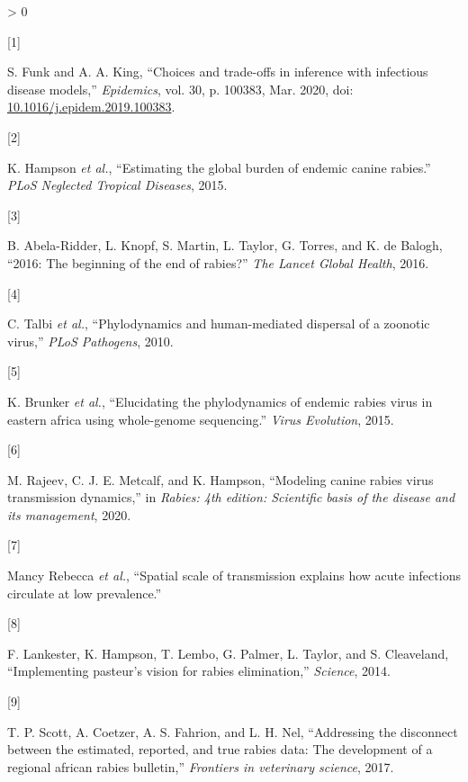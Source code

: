 \documentclass[
  oneside]{book}
\newlength{\cslhangindent}
\newlength{\csllabelwidth}
\newenvironment{CSLReferences}[2] %
 {%
  \setlength{\parindent}{0pt}
  \ifodd #1 \everypar{\setlength{\hangindent}{\cslhangindent}}\ignorespaces\fi
  \ifnum #2 > 0
  \setlength{\parskip}{#2\baselineskip}
  \fi
 }%
 {}
\newcommand{\CSLLeftMargin}[1]{\parbox[t]{\csllabelwidth}{#1}}
\newcommand{\CSLRightInline}[1]{\parbox[t]{\linewidth - \csllabelwidth}{#1}\break}
\begin{document}
\setlength{\parskip}{1em}

\hypertarget{refs_main}{}
\begin{CSLReferences}{0}{0}
\leavevmode\hypertarget{ref-funk2020}{}%
\CSLLeftMargin{{[}1{]} }
\CSLRightInline{S. Funk and A. A. King, {``Choices and trade-offs in inference with infectious disease models,''} \emph{Epidemics}, vol. 30, p. 100383, Mar. 2020, doi: \href{https://doi.org/10.1016/j.epidem.2019.100383}{10.1016/j.epidem.2019.100383}.}

\leavevmode\hypertarget{ref-hampson2015}{}%
\CSLLeftMargin{{[}2{]} }
\CSLRightInline{K. Hampson \emph{et al.}, {``Estimating the global burden of endemic canine rabies.''} \emph{PLoS Neglected Tropical Diseases}, 2015.}

\leavevmode\hypertarget{ref-abela-ridder2016}{}%
\CSLLeftMargin{{[}3{]} }
\CSLRightInline{B. Abela-Ridder, L. Knopf, S. Martin, L. Taylor, G. Torres, and K. de Balogh, {``2016: The beginning of the end of rabies?''} \emph{The Lancet Global Health}, 2016.}

\leavevmode\hypertarget{ref-talbi2010}{}%
\CSLLeftMargin{{[}4{]} }
\CSLRightInline{C. Talbi \emph{et al.}, {``Phylodynamics and human-mediated dispersal of a zoonotic virus,''} \emph{PLoS Pathogens}, 2010.}

\leavevmode\hypertarget{ref-brunker2015}{}%
\CSLLeftMargin{{[}5{]} }
\CSLRightInline{K. Brunker \emph{et al.}, {``Elucidating the phylodynamics of endemic rabies virus in eastern africa using whole-genome sequencing.''} \emph{Virus Evolution}, 2015.}

\leavevmode\hypertarget{ref-rajeev2020modeling}{}%
\CSLLeftMargin{{[}6{]} }
\CSLRightInline{M. Rajeev, C. J. E. Metcalf, and K. Hampson, {``Modeling canine rabies virus transmission dynamics,''} in \emph{Rabies: 4th edition: Scientific basis of the disease and its management}, 2020.}

\leavevmode\hypertarget{ref-Mancyinprep}{}%
\CSLLeftMargin{{[}7{]} }
\CSLRightInline{Mancy Rebecca \emph{et al.}, {``Spatial scale of transmission explains how acute infections circulate at low prevalence.''}}

\leavevmode\hypertarget{ref-lankester2014}{}%
\CSLLeftMargin{{[}8{]} }
\CSLRightInline{F. Lankester, K. Hampson, T. Lembo, G. Palmer, L. Taylor, and S. Cleaveland, {``Implementing pasteur's vision for rabies elimination,''} \emph{Science}, 2014.}

\leavevmode\hypertarget{ref-scott2017}{}%
\CSLLeftMargin{{[}9{]} }
\CSLRightInline{T. P. Scott, A. Coetzer, A. S. Fahrion, and L. H. Nel, {``Addressing the disconnect between the estimated, reported, and true rabies data: The development of a regional african rabies bulletin,''} \emph{Frontiers in veterinary science}, 2017.}


\end{CSLReferences}
\end{document}
